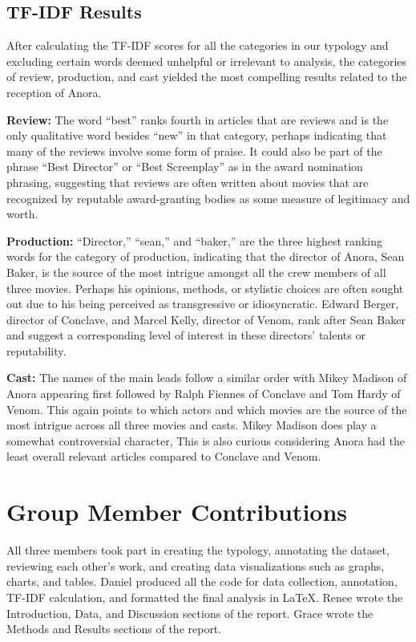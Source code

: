 \documentclass[letterpaper]{article} %
\begin{document}
\subsection{TF-IDF Results}

After calculating the TF-IDF scores for all the categories in our typology and excluding certain words deemed unhelpful or irrelevant to analysis, the categories of review, production, and cast yielded the most compelling results related to the reception of Anora.

\textbf{Review:} The word “best” ranks fourth in articles that are reviews and is the only qualitative word besides “new” in that category, perhaps indicating that many of the reviews involve some form of praise. It could also be part of the phrase “Best Director” or “Best Screenplay” as in the award nomination phrasing, suggesting that reviews are often written about movies that are recognized by reputable award-granting bodies as some measure of legitimacy and worth.

\textbf{Production:} “Director,” “sean,” and “baker,” are the three highest ranking words for the category of production, indicating that the director of Anora, Sean Baker, is the source of the most intrigue amongst all the crew members of all three movies. Perhaps his opinions, methods, or stylistic choices are often sought out due to his being perceived as transgressive or idiosyncratic. Edward Berger, director of Conclave, and Marcel Kelly, director of Venom, rank after Sean Baker and suggest a corresponding level of interest in these directors' talents or reputability. 

\textbf{Cast:} The names of the main leads follow a similar order with Mikey Madison of Anora appearing first followed by Ralph Fiennes of Conclave and Tom Hardy of Venom. This again points to which actors and which movies are the source of the most intrigue across all three movies and casts. Mikey Madison does play a somewhat controversial character, This is also curious considering Anora had the least overall relevant articles compared to Conclave and Venom.

\section{Group Member Contributions}
All three members took part in creating the typology, annotating the dataset, reviewing each other’s work, and creating data visualizations such as graphs, charts, and tables. Daniel produced all the code for data collection, annotation, TF-IDF calculation, and formatted the final analysis in LaTeX. Renee wrote the Introduction, Data, and Discussion sections of the report. Grace wrote the Methods and Results sections of the report.
\end{document}
